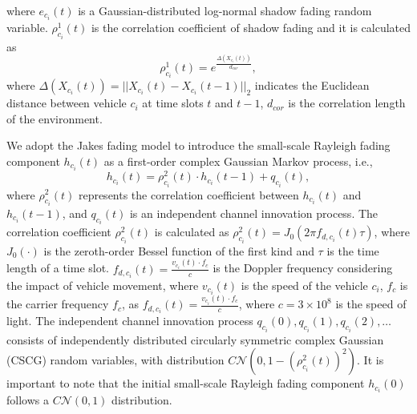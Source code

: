 \documentclass[lettersize,journal,onecolumn]{IEEEtran}
\begin{document}
where  ${{e}_{{{c}_{i}}}}(t)$ is a Gaussian-distributed log-normal shadow fading random variable.
$\rho _{{{c}_{i}}}^{1}(t)$ is the correlation coefficient of shadow fading and it is calculated as
\begin{equation}
\rho _{{{c}_{i}}}^{1}(t)={{e}^{\frac{\Delta ({{X}_{{{c}_{i}}}}(t))}{{{d}_{{cor}}}}}},
\label{eq5}
\end{equation}
where $\Delta ({{X}_{{{c}_{i}}}}(t))=||{{X}_{{{c}_{i}}}}(t)-{{X}_{{{c}_{i}}}}(t-1)|{{|}_{2}}$ indicates the Euclidean distance between vehicle ${{{c}}_{i}}$ at time slots $t$ and $t-1$, ${{d}_{{cor}}}$ is the correlation length of the environment.

We adopt the Jakes fading model to introduce the small-scale Rayleigh fading component ${{h}_{{{c}_{i}}}}(t)$ as a first-order complex Gaussian Markov process, i.e.,
\begin{equation}
{{h}_{{{c}_{i}}}}(t)=\rho _{{{c}_{i}}}^{2}(t)\cdot {{h}_{{{c}_{i}}}}(t-1)+{{q}_{{{c}_{i}}}}(t),
\label{eq6}
\end{equation}
where $\rho _{{{c}_{i}}}^{2}(t)$ represents the correlation coefficient between ${{h}_{{{c}_{i}}}}(t)$ and ${{h}_{{{c}_{i}}}}(t-1)$, and ${{q}_{{{c}_{i}}}}(t)$ is an independent channel innovation process. The correlation coefficient $\rho _{{{c}_{i}}}^{2}(t)$ is calculated as $\rho _{{{c}_{i}}}^{2}(t)={{J}_{0}}(2\pi {{f}_{d,{{c}_{i}}}}(t)\tau )$, where ${{J}_{0}}(\cdot )$ is the zeroth-order Bessel function of the first kind and $\tau $ is the time length of a time slot. ${{f}_{d,{{c}_{i}}}}(t)=\frac{{{v}_{{{c}_{i}}}}(t)\cdot {{f}_{c}}}{c}$ is the Doppler frequency considering the impact of vehicle movement, where ${{v}_{{{c}_{i}}}}(t)$ is the speed of the vehicle $c_i$, ${{f}_{c}}$ is the carrier frequency ${{f}_{c}}$, as ${{f}_{d,{{c}_{i}}}}(t)=\frac{{{v}_{{{c}_{i}}}}(t)\cdot {{f}_{c}}}{c}$, where $c=3\times {{10}^{8}}$ is the speed of light. The independent channel innovation process ${{q}_{{{c}_{i}}}}(0),{{q}_{{{c}_{i}}}}(1),{{q}_{{{c}_{i}}}}(2),\ldots$ consists of independently distributed circularly symmetric complex Gaussian (CSCG) random variables, with distribution $C\mathcal{N}\left( 0,1-{{(\rho _{{{c}_{i}}}^{2}(t))}^{2}} \right)$. It is important to note that the initial small-scale Rayleigh fading component ${{h}_{{{c}_{i}}}}(0)$ follows a $C\mathcal{N}\left( 0,1 \right)$ distribution.
\end{document}
